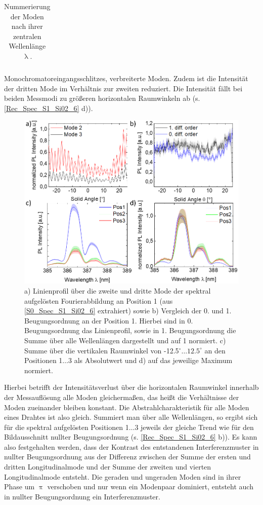 \begin{table}[h]
\begin{tabular}{llll}
\end{tabular}
\caption{Nummerierung der Moden nach ihrer zentralen Wellenlänge $\uplambda$.}
\label{ModenNum} 
\end{table}\noindent Monochromatoreingangsschlitzes, verbreiterte Moden. Zudem ist die Intensität der dritten Mode im Verhältnis zur zweiten reduziert. Die Intensität fällt bei beiden Messmodi zu größeren horizontalen Raumwinkeln ab (s. \autoref{Rec_Spec_S1_Si02_6} d)).\begin{figure}[h]
\includegraphics[width=.6\textwidth]{Bilder/SiO2/Rec_Spec_S1_Si02_6}
\caption{a) Linienprofil über die zweite und dritte Mode der spektral aufgelösten Fourierabbildung an Position 1 (aus \autoref{S0_Spec_S1_Si02_6} extrahiert) sowie b) Vergleich der 0. und 1. Beugungsordnung an der Position 1. Hierbei sind in 0. Beugungsordnung das Linienprofil, sowie in 1. Beugungsordnung die Summe über alle Wellenlängen dargestellt und auf 1 normiert. c) Summe über die vertikalen Raumwinkel von -12.5$^\circ \ldots \text{12.5}^\circ$ an den Positionen 1$\ldots$3 als Absolutwert und d) auf das jeweilige Maximum normiert.}
\label{Rec_Spec_S1_Si02_6}
\end{figure}Hierbei betrifft der Intensitätsverlust über die horizontalen Raumwinkel innerhalb der Messauflösung alle Moden gleichermaßen, das heißt die Verhältnisse der Moden zueinander bleiben konstant. Die Abstrahlcharakteristik für alle Moden eines Drahtes ist also gleich. Summiert man über alle Wellenlängen, so ergibt sich für die spektral aufgelösten Positionen 1$\ldots$3 jeweils der gleiche Trend wie für den Bildausschnitt nullter Beugungsordnung (s. \autoref{Rec_Spec_S1_Si02_6} b)). Es kann also festgehalten werden, dass der Kontrast des entstandenen Interferenzmuster in nullter Beugungsordnung aus der Differenz zwischen der Summe der ersten und dritten Longitudinalmode und der Summe der zweiten und vierten Longitudinalmode entsteht. Die geraden und ungeraden Moden sind in ihrer Phase um $\uppi$ verschoben und nur wenn ein Modenpaar dominiert, entsteht auch in nullter Beugungsordnung ein Interferenzmuster.
